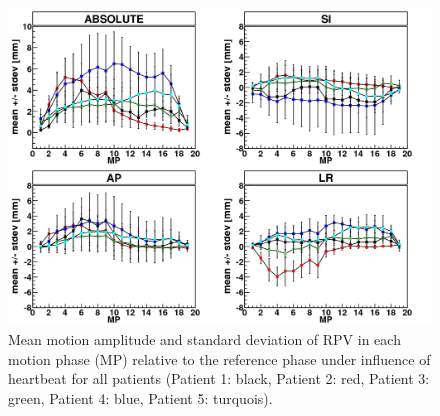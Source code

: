 \begin{figure}[H]
\begin{center}
 \includegraphics[scale=0.22]{./teile/results_human/MAYO_allPatients_HB_RPV.png}
\caption{Mean motion amplitude and standard deviation of RPV in each motion phase (MP) relative to the reference phase under influence of 
heartbeat for all patients (Patient 1: black, Patient 2: red, Patient 3: green, Patient 4: blue, Patient 5: turquois). }
\label{fig:motion_hb_rpv}
\end{center}
\end{figure}

\newpage

\vspace*{1cm}

